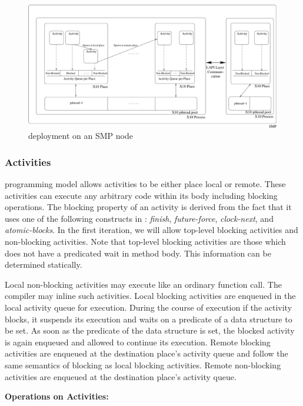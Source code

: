 \begin{figure}
\center
\includegraphics[scale=0.5]{design-A}
\caption{\Xten{} deployment on an SMP node}
\label{fig:deploy1}
\end{figure}

\subsubsection{Activities}
\Xten{} programming model allows activities to be either place local
or remote.  These activities can execute any arbitrary code within its
body including blocking operations. The blocking property of an
activity is derived from the fact that it uses one of the following
\Xten{} constructs in : {\it finish}, {\it future-force}, {\it
clock-next}, and {\it atomic-blocks}. In the first iteration, we will
allow top-level blocking activities  and non-blocking activities. Note
that top-level blocking activities are those which does not have a
predicated wait in method body. This information can be determined statically.

Local non-blocking activities may execute like an ordinary function
call.  The compiler may inline such activities.  Local blocking
activities are enqueued in the local activity queue for
execution. During the course of execution if the activity blocks, it
suspends its execution and waits on a predicate of a data structure to
be set. As soon as the predicate of the data structure is set, the
blocked activity is again enqueued and allowed to continue its
execution. Remote blocking activities are enqueued at the destination
place's activity queue and follow the same semantics of blocking as
local blocking activities. Remote non-blocking activities are enqueued
at the destination place's activity queue.


{\bf Operations on Activities:}


